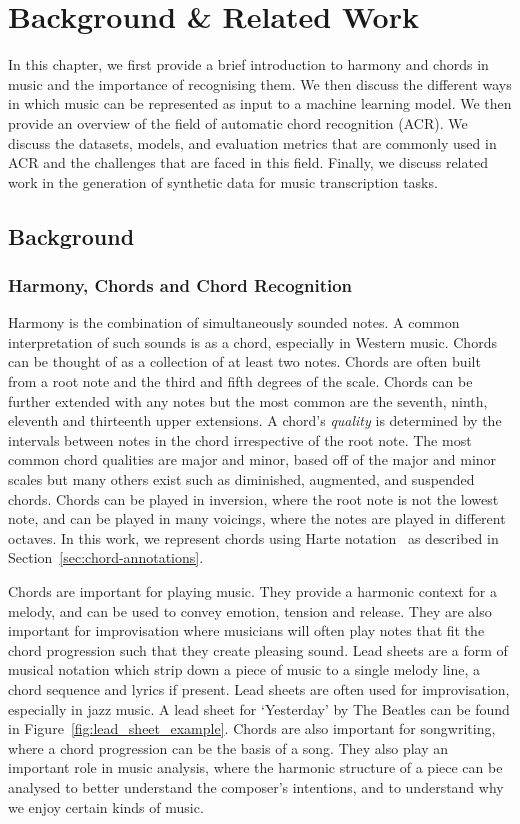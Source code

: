 \chapter{Background \& Related Work}

In this chapter, we first provide a brief introduction to harmony and chords in music and the importance of recognising them. We then discuss the different ways in which music can be represented as input to a machine learning model. We then provide an overview of the field of automatic chord recognition (ACR). We discuss the datasets, models, and evaluation metrics that are commonly used in ACR and the challenges that are faced in this field. Finally, we discuss related work in the generation of synthetic data for music transcription tasks.

\section{Background}

\subsection{Harmony, Chords and Chord Recognition}

Harmony is the combination of simultaneously sounded notes. A common interpretation of such sounds is as a chord, especially in Western music. Chords can be thought of as a collection of at least two notes. Chords are often built from a root note and the third and fifth degrees of the scale. Chords can be further extended with any notes but the most common are the seventh, ninth, eleventh and thirteenth upper extensions. A chord's \emph{quality} is determined by the intervals between notes in the chord irrespective of the root note. The most common chord qualities are major and minor, based off of the major and minor scales but many others exist such as diminished, augmented, and suspended chords. Chords can be played in inversion, where the root note is not the lowest note, and can be played in many voicings, where the notes are played in different octaves. In this work, we represent chords using Harte notation~\citep{HarteNotation} as described in Section~\ref{sec:chord-annotations}.

Chords are important for playing music. They provide a harmonic context for a melody, and can be used to convey emotion, tension and release. They are also important for improvisation where musicians will often play notes that fit the chord progression such that they create pleasing sound. Lead sheets are a form of musical notation which strip down a piece of music to a single melody line, a chord sequence and lyrics if present. Lead sheets are often used for improvisation, especially in jazz music. A lead sheet for `Yesterday' by The Beatles can be found in Figure~\ref{fig:lead_sheet_example}. Chords are also important for songwriting, where a chord progression can be the basis of a song. They also play an important role in music analysis, where the harmonic structure of a piece can be analysed to better understand the composer's intentions, and to understand why we enjoy certain kinds of music.

